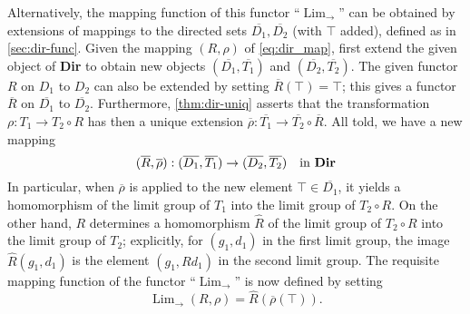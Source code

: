 \documentclass[11pt,a4paper]{report}
\DeclareMathOperator{\Lim}{Lim}
\begin{document}
Alternatively, the mapping function of this functor ``$\Lim_{\rightarrow}$'' can be obtained by extensions of mappings to the
directed sets $\overline{D_1},\overline{D_2}$ (with $\top$ added), defined as in \cref{sec:dir-func}. Given the mapping $(R,\rho)$
of \cref{eq:dir_map}, first extend the given object of \textbf{Dir} to obtain new objects $(\overline{D_1},\overline{T_1})$ and
$(\overline{D_2},\overline{T_2})$. The given functor $R$ on $D_1$ to $D_2$ can also be extended by setting
$\overline{R}(\top)=\top$; this gives a functor $\overline{R}$ on $\overline{D_1}$ to $\overline{D_2}$. Furthermore, 
\cref{thm:dir-uniq} asserts that the transformation $\rho:T_1\rightarrow T_2\circ R$ has then a unique extension
$\overline{\rho}:\overline{T_1}\rightarrow \overline{T_2}\circ \overline{R}$.
All told, we have a new mapping
\begin{equation*}
	(\overline{R},\overline{\rho}):(\overline{D_1},\overline{T_1})\rightarrow (\overline{D_2},\overline{T_2})\quad\text{in \textbf{Dir}}
\end{equation*}
In particular, when $\overline{\rho}$ is applied to the new element $\top\in\overline{D_1}$, it yields a homomorphism of the limit group
of $T_1$ into the limit group of $T_2\circ R$. On the other hand, $R$ determines a homomorphism $\hat{R}$ of the limit group of
$T_2\circ R$ into the limit group of $T_2$; explicitly, for $(g_1,d_1)$ in the first limit group, the image $\hat{R}(g_1,d_1)$ is the
element $(g_1,R d_1)$ in the second limit group. The requisite mapping function of the functor ``$\Lim_{\rightarrow}$'' is now defined by
setting
\begin{equation*}
	\Lim_{\rightarrow}(R,\rho)=\hat{R}(\overline{\rho}(\top)).
\end{equation*}
\end{document}
